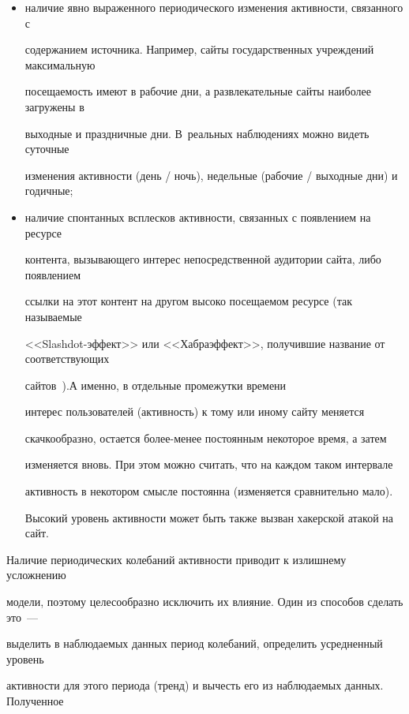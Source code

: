       \begin{itemize}


\item наличие явно выраженного периодического изменения активности, связанного с 


содержанием источника. Например, сайты государственных учреждений максимальную 


посещаемость имеют в рабочие дни, а развлекательные сайты наиболее загружены в 


выходные и праздничные дни. В~реальных наблюдениях можно видеть суточные 


изменения активности (день / ночь), недельные (рабочие / выходные дни) и годичные;


\item наличие спонтанных всплесков активности, связанных с появлением на ресурсе 


контента, вызывающего интерес непосредственной аудитории сайта, либо появлением 


ссылки на этот контент на другом высоко посещаемом ресурсе (так называемые 


<<Slashdot-эффект>> или <<Хабраэффект>>, получившие название от соответствующих 


сайтов~\cite{12-8}).\linebreak А имен\-но, в отдельные промежутки времени 


интерес пользователей (активность) к тому или иному сайту меняется 


скачкообразно, остается бо\-лее-ме\-нее постоянным некоторое вре\-мя, а затем 


изменяется вновь. При этом можно считать, что на каждом таком интервале 


активность в некотором смыс\-ле постоянна (изменяется сравнительно мало). 


Высокий уровень активности может быть также вызван хакерской атакой на сайт.


\end{itemize}





      Наличие периодических колебаний активности приводит к излишнему усложнению 


модели, поэтому целесообразно исклю\-чить их влияние. Один из способов сделать это~--- 


выделить в наблюдаемых данных период колебаний, определить усредненный уровень 


активности для этого периода (тренд) и вычесть его из наблюдаемых данных. Полученное 


